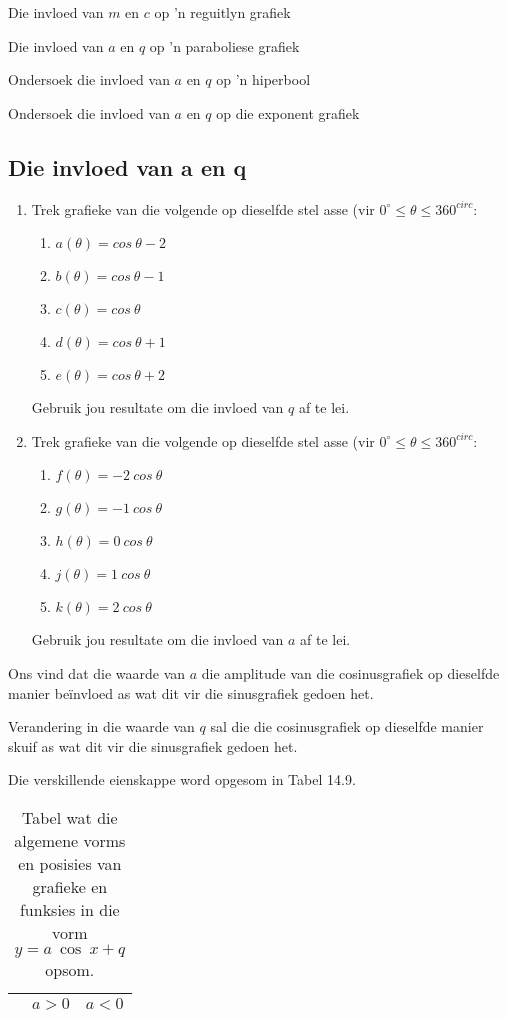 \begin{Ondersoek}{Die invloed van $m$ en $c$ op 'n reguitlyn grafiek}
\begin{Ondersoek}{Die invloed van $a$ en $q$ op 'n paraboliese grafiek}
\begin{Ondersoek}{Ondersoek die invloed van $a$ en $q$ op 'n hiperbool}
\begin{Ondersoek}{Ondersoek die invloed van $a$ en $q$ op die exponent grafiek}
\subsection*{Die invloed van a en q}
\nopagebreak
\begin{enumerate}[noitemsep, label=\textbf{\arabic*}. ] 
\item Trek grafieke van die volgende op dieselfde stel asse (vir $0^{\circ} \leq \theta \leq 360^{circ}$:
\begin{enumerate}[noitemsep, label=\textbf{\alph*}. ] 
\item $a(\theta )=cos~\theta -2$
\item $b(\theta )=cos~\theta -1$
\item $c(\theta )=cos~\theta $
\item $d(\theta )=cos~\theta +1$
\item $e(\theta )=cos~\theta +2$\end{enumerate}
Gebruik jou resultate om die invloed van $q$ af te lei.
\item Trek grafieke van die volgende op dieselfde stel asse (vir $0^{\circ} \leq \theta \leq 360^{circ}$:
\begin{enumerate}[noitemsep, label=\textbf{\alph*}. ] 
\item $f(\theta )=-2~cos~\theta $
\item $g(\theta )=-1~cos~\theta $
\item $h(\theta )=0~cos~\theta $
\item $j(\theta )=1~cos~\theta $
\item $k(\theta )=2~cos~\theta $\end{enumerate}
Gebruik jou resultate om die invloed van $a$ af te lei.
\end{enumerate}
Ons vind dat die waarde van $a$ die amplitude van die cosinusgrafiek op dieselfde manier beïnvloed as wat dit vir
die sinusgrafiek gedoen het.\par 
Verandering in die waarde van $q$ sal die die cosinusgrafiek op dieselfde manier skuif as wat dit vir die sinusgrafiek
gedoen het.\par 
Die verskillende eienskappe word opgesom in Tabel 14.9.\par 
\begin{table}[htb]
\begin{center}
\caption{Tabel wat die algemene vorms en posisies van grafieke en funksies in die vorm $y=a~ \cos~x + q$ opsom.}
\label{tab:mt:g:summarycos10}
\begin{tabular}{|c||c|c|}\hline
& $a>0$&$a<0$\\\hline\hline

\end{tabular}
\end{center}
\end{table}
\end{Ondersoek}
\end{Ondersoek}
\end{Ondersoek}
\end{Ondersoek}

